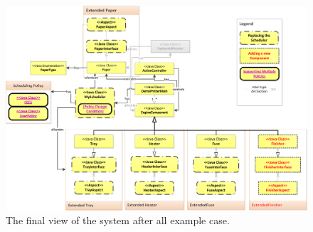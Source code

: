 				
	\begin{center}
	\begin{figure}
	\includegraphics[height=\textwidth , angle=90]{chapteroce/images/finalview.png}
	\caption{The final view of the system after all example case.}
	\label{fig:finalview}
	\end{figure}
	\end{center}
	
